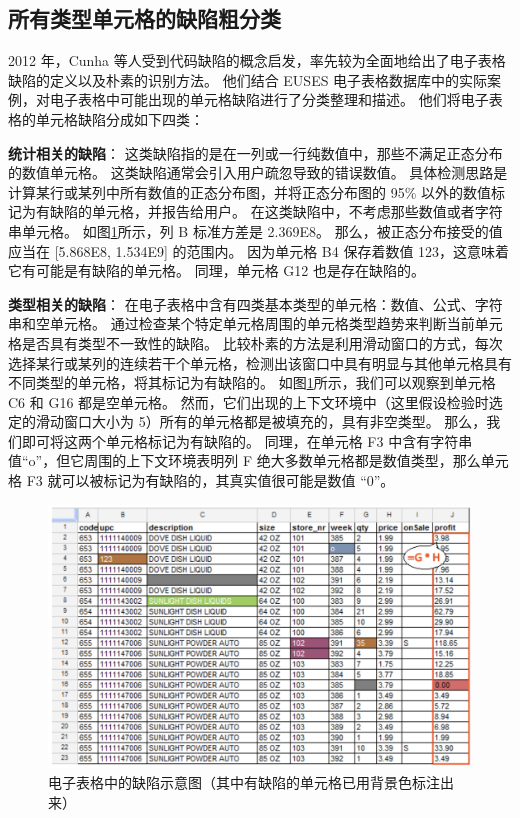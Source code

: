 \subsection{所有类型单元格的缺陷粗分类}
2012 年，Cunha 等人\cite{cunha2012towards}受到代码缺陷的概念启发，率先较为全面地给出了电子表格缺陷的定义以及朴素的识别方法。
他们结合 EUSES 电子表格数据库中的实际案例，对电子表格中可能出现的单元格缺陷进行了分类整理和描述。
他们将电子表格的单元格缺陷分成如下四类：

\textbf{统计相关的缺陷}：
这类缺陷指的是在一列或一行纯数值中，那些不满足正态分布的数值单元格。
这类缺陷通常会引入用户疏忽导致的错误数值。
具体检测思路是计算某行或某列中所有数值的正态分布图，并将正态分布图的 95\% 以外的数值标记为有缺陷的单元格，并报告给用户。
在这类缺陷中，不考虑那些数值或者字符串单元格。
如图\ref{figure-valuesmell}所示，列 B 标准方差是 2.369E8。
那么，被正态分布接受的值应当在 [5.868E8, 1.534E9] 的范围内。
因为单元格 B4 保存着数值 123，这意味着它有可能是有缺陷的单元格。
同理，单元格 G12 也是存在缺陷的。

\textbf{类型相关的缺陷}：
在电子表格中含有四类基本类型的单元格：数值、公式、字符串和空单元格。
通过检查某个特定单元格周围的单元格类型趋势来判断当前单元格是否具有类型不一致性的缺陷。
比较朴素的方法是利用滑动窗口的方式，每次选择某行或某列的连续若干个单元格，检测出该窗口中具有明显与其他单元格具有不同类型的单元格，将其标记为有缺陷的。
如图\ref{figure-valuesmell}所示，我们可以观察到单元格 C6 和 G16 都是空单元格。
然而，它们出现的上下文环境中（这里假设检验时选定的滑动窗口大小为 5）所有的单元格都是被填充的，具有非空类型。
那么，我们即可将这两个单元格标记为有缺陷的。
同理，在单元格 F3 中含有字符串值“o”，但它周围的上下文环境表明列 F 绝大多数单元格都是数值类型，那么单元格 F3 就可以被标记为有缺陷的，其真实值很可能是数值 “0”。

\begin{figure}[tbp]    
    \centering
    \includegraphics[width=\textwidth]{figure/relatedwork/valueSmell.png}
    \caption{电子表格中的缺陷示意图（其中有缺陷的单元格已用背景色标注出来）}
    \label{figure-valuesmell}
\end{figure}

